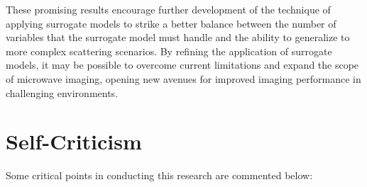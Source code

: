 		These promising results encourage further development of the technique of applying surrogate models to strike a better balance between the number of variables that the surrogate model must handle and the ability to generalize to more complex scattering scenarios. By refining the application of surrogate models, it may be possible to overcome current limitations and expand the scope of microwave imaging, opening new avenues for improved imaging performance in challenging environments.
		
	\section{Self-Criticism}\label{chap:final:selfcriticism}
	
		Some critical points in conducting this research are commented below:
		
		
